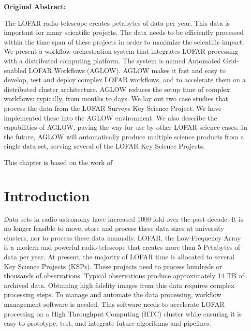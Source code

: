 \begin{tcolorbox}[colback=thesislight,colframe=thesismid,width=\dimexpr\textwidth+12mm\relax]

    \textbf{Original Abstract:}

The LOFAR radio telescope creates petabytes of data per year. This data is important for many scientific projects. The data needs to be efficiently processed within the time span of these projects in order to maximize the scientific impact. We present a workflow orchestration system that integrates LOFAR processing with a distributed computing platform. The system is named Automated Grid-enabled LOFAR Workflows (AGLOW). AGLOW makes it fast and easy to develop, test and deploy complex LOFAR workflows, and to accelerate them on a distributed cluster architecture. AGLOW reduces the setup time of complex workflows: typically, from months to days. We lay out two case studies that process the data from the LOFAR Surveys Key Science Project. We have implemented these into the AGLOW environment. We also describe the capabilities of AGLOW, paving the way for use by other LOFAR science cases. In the future, AGLOW will automatically produce multiple science products from a single data set, serving several of the LOFAR Key Science Projects.

     This chapter is based on the work of  
\end{tcolorbox}


%
%
\section{Introduction}\label{sec:ch5_intro}

Data sets in radio astronomy have increased 1000-fold over the past decade\cite{sabater_datasize}. It is no longer feasible to move, store and process these data sizes at university clusters, nor to process these data manually. \Gls{LOFAR}, the Low-Frequency Array\cite{LOFAR} is a modern and powerful radio telescope that creates more than 5 Petabytes of data per year. At present, the majority of LOFAR time is allocated to several Key Science Projects (KSPs)\cite{lotss}. These projects need to process hundreds or thousands of observations. Typical observations produce approximately 14 TB of archived data. Obtaining high fidelity images from this data requires complex processing steps. To manage and automate the data processing, workflow management software is needed. This software needs to accelerate LOFAR processing on a High Throughput Computing (\Gls{HTC}) cluster while ensuring it is easy to prototype, test, and integrate future algorithms and pipelines. 
	
